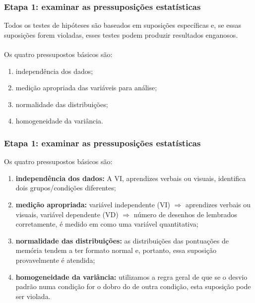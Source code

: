 \documentclass[11pt]{beamer}
\begin{document}
\begin{frame}
\frametitle{Etapa 1: examinar as pressuposições estatísticas}

Todos os testes de hipóteses são baseados em suposições específicas e, se essas suposições forem violadas, esses testes podem produzir resultados enganosos.\\~\\
Os quatro pressupostos básicos são:

\begin{enumerate}
\item independência dos dados;
\item medição apropriada das variáveis para análise;
\item normalidade das distribuições;
\item homogeneidade da variância.
\end{enumerate}

\end{frame}

\begin{frame}
\frametitle{Etapa 1: examinar as pressuposições estatísticas}

Os quatro pressupostos básicos são:

\begin{enumerate}
\item \textbf{independência dos dados:} A VI, aprendizes verbais ou visuais, identifica dois grupos/condições diferentes;
\item \textbf{medição apropriada:} variável independente (VI) \(\Rightarrow\) aprendizes verbais ou visuais, variável dependente (VD) \(\Rightarrow\) número de desenhos de lembrados corretamente, é medido em como uma variável quantitativa;
\item \textbf{normalidade das distribuições:} as distribuições das pontuações de memória tendem a ter formato normal e, portanto, essa suposição provavelmente é atendida;
\item \textbf{homogeneidade da variância:} utilizamos a regra geral de que se o desvio padrão numa condição for o dobro do de outra condição, esta suposição pode ser violada.
\end{enumerate}

\end{frame}
\end{document}
